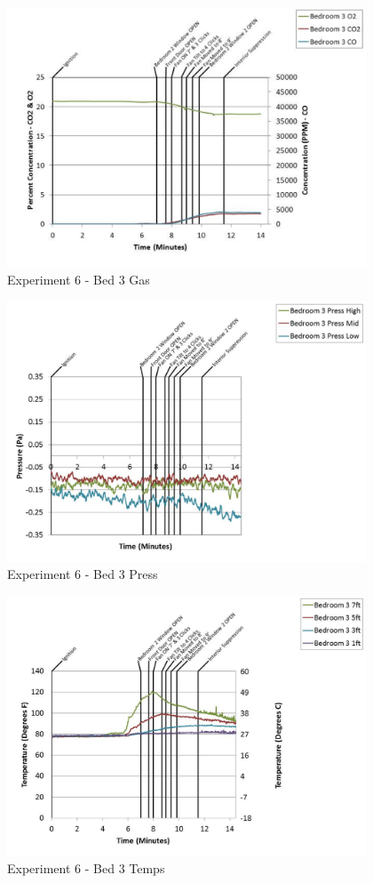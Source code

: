\documentclass{article}
\begin{document}
\begin{appendices}
	\clearpage

	\begin{figure}[h!]
		\centering
		\includegraphics[height=3.05in]{0_Images/Results_Charts/Exp_6_Charts/Bed3Gas.pdf}
		\caption{Experiment 6 - Bed 3 Gas}
	\end{figure}
 

	\begin{figure}[h!]
		\centering
		\includegraphics[height=3.05in]{0_Images/Results_Charts/Exp_6_Charts/Bed3Press.pdf}
		\caption{Experiment 6 - Bed 3 Press}
	\end{figure}
 
	\clearpage

	\begin{figure}[h!]
		\centering
		\includegraphics[height=3.05in]{0_Images/Results_Charts/Exp_6_Charts/Bed3Temps.pdf}
		\caption{Experiment 6 - Bed 3 Temps}
	\end{figure}
 


\end{appendices}
\end{document}
